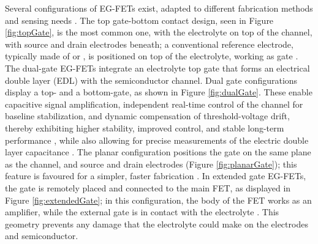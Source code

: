 Several configurations of EG-FETs exist, adapted to different fabrication
methods and sensing needs \citep{shkodraElectrolytegated2021}. The top
gate-bottom contact design, seen in Figure \ref{fig:topGate}, is the most common
one, with the electrolyte on top of the channel, with source and drain
electrodes beneath; a conventional reference electrode, typically made of
 or , is positioned on top of the electrolyte, working as
gate \citep{shkodraElectrolytegated2021}. The dual-gate EG-FETs integrate an
electrolyte top gate that forms an electrical double layer (EDL) with the
semiconductor channel.
%
%
Dual gate configurations display a top- and a bottom-gate, as shown in Figure
\ref{fig:dualGate}. These enable capacitive signal amplification, independent
real-time control of the channel for baseline stabilization, and dynamic
compensation of threshold-voltage drift, thereby exhibiting higher stability,
improved control, and stable long-term performance \citep{lagoRealtime2022,
kammarcheduActive2026}, while also allowing for precise measurements of the
electric double layer capacitance \citep{melzerCharacterization2014}. The planar
configuration positions the gate on the same plane as the channel, and source
and drain electrodes (Figure \ref{fig:planarGate}); this feature is favoured for
a simpler, faster fabrication \citep{joshiUnderstanding2018}. In extended gate
EG-FETs, the gate is remotely placed and connected to the main FET, as displayed
in Figure \ref{fig:extendedGate}; in this configuration, the body of the FET
works as an amplifier, while the external gate is in contact with the
electrolyte \citep{torricelliElectrolytegated2021}. This geometry prevents any
damage that the electrolyte could make on the electrodes and semiconductor.

